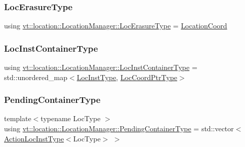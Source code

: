 \mbox{\label{structvt_1_1location_1_1_location_manager_a0c153c55a8938e99fad5386699653220}} 
\subsubsection{\texorpdfstring{Loc\+Erasure\+Type}{LocErasureType}}
{\footnotesize\ttfamily using \hyperlink{structvt_1_1location_1_1_location_manager_a0c153c55a8938e99fad5386699653220}{vt\+::location\+::\+Location\+Manager\+::\+Loc\+Erasure\+Type} =  \hyperlink{structvt_1_1location_1_1_location_coord}{Location\+Coord}}

\mbox{\label{structvt_1_1location_1_1_location_manager_adf4df6480ad89271a802d6d59bcf424e}} 
\subsubsection{\texorpdfstring{Loc\+Inst\+Container\+Type}{LocInstContainerType}}
{\footnotesize\ttfamily using \hyperlink{structvt_1_1location_1_1_location_manager_adf4df6480ad89271a802d6d59bcf424e}{vt\+::location\+::\+Location\+Manager\+::\+Loc\+Inst\+Container\+Type} =  std\+::unordered\+\_\+map$<$\hyperlink{namespacevt_1_1location_a4db6456e8024af2d23fc5ae560fef866}{Loc\+Inst\+Type}, \hyperlink{structvt_1_1location_1_1_location_manager_a98ed824c058080e538546fc731cb8f4c}{Loc\+Coord\+Ptr\+Type}$>$}

\mbox{\label{structvt_1_1location_1_1_location_manager_aad005a828c535232cd6b63859b25b171}} 
\subsubsection{\texorpdfstring{Pending\+Container\+Type}{PendingContainerType}}
{\footnotesize\ttfamily template$<$typename Loc\+Type $>$ \\
using \hyperlink{structvt_1_1location_1_1_location_manager_aad005a828c535232cd6b63859b25b171}{vt\+::location\+::\+Location\+Manager\+::\+Pending\+Container\+Type} =  std\+::vector$<$\hyperlink{structvt_1_1location_1_1_location_manager_a6de3841092c537efc5fb8376128bfe18}{Action\+Loc\+Inst\+Type}$<$Loc\+Type$>$ $>$}

